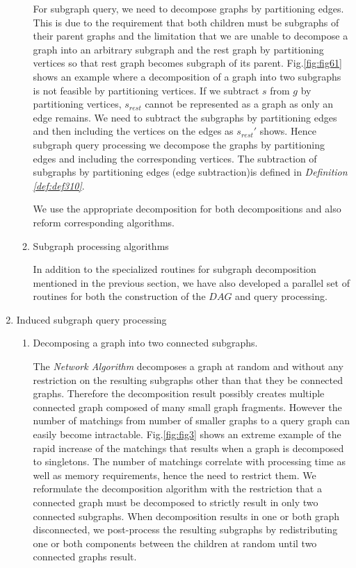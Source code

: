 \begin{enumerate}
\begin{enumerate}
For subgraph query, we need to decompose graphs by partitioning edges. This is due to the requirement that both children must be subgraphs of their parent graphs
and the limitation that we are unable to decompose a graph into an arbitrary subgraph and the rest graph by partitioning vertices so that rest graph becomes subgraph of its parent.
Fig.\ref{fig:fig61} shows an example where a decomposition of a graph into two subgraphs is not feasible by partitioning vertices.
If we subtract $s$ from $g$ by partitioning vertices, $s_{rest}$ cannot be represented as a graph as only an edge remains. We need to subtract the subgraphs by partitioning edges and then including the vertices on the edges as $s_{rest}'$ shows. Hence subgraph query processing we decompose the graphs by partitioning edges and including the corresponding vertices.
The subtraction of subgraphs by partitioning edges (edge subtraction)is defined in \textit{Definition \ref{def:def310}}.

We use the appropriate decomposition for both decompositions and also reform corresponding algorithms.

\item Subgraph processing algorithms

In addition to the specialized routines for subgraph decomposition mentioned in the previous section,  we have also developed a parallel set of routines for both the construction of the $DAG$ and query processing. 

\end{enumerate}


\item Induced subgraph query processing

\begin{enumerate}
\item Decomposing a graph into two connected subgraphs.


The \textit{Network Algorithm} decomposes a graph at random and without any restriction on the resulting subgraphs other than that they be connected graphs.
Therefore the decomposition result possibly creates multiple connected graph composed of many small graph fragments.
However the number of matchings from number of smaller graphs to a query graph can easily become intractable.
Fig.\ref{fig:fig3} shows an extreme example of the rapid increase of the matchings that results when a graph is decomposed to singletons.
The number of matchings correlate with processing time as well as memory requirements, hence the need to restrict them. We reformulate the decomposition algorithm with the restriction that a connected graph must be decomposed to strictly result in only two connected subgraphs. When decomposition results in one or both graph disconnected, we post-process the resulting subgraphs by redistributing one or both components between the children  at random until two connected graphs result.


\end{enumerate}
\end{enumerate}
